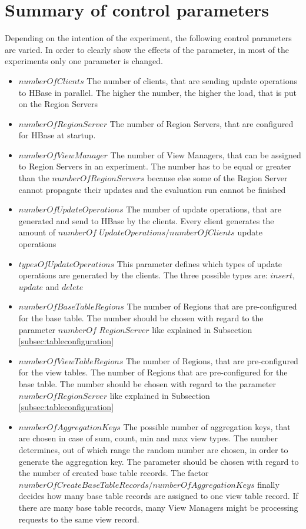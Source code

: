 \documentclass[11pt,a4paper,bibtotoc,idxtotoc,headsepline,footsepline,footexclude,BCOR12mm,DIV13]{scrbook}
\begin{document}
\section{Summary of control parameters}
Depending on the intention of the experiment, the following control parameters are varied. In order to clearly show the effects of the parameter, in most of the experiments only one parameter is changed.
\begin{itemize}
	\item $numberOfClients$ The number of clients, that are sending update operations to HBase in parallel. The higher the number, the higher the load, that is put on the Region Servers		
	\item $numberOfRegionServer$ The number of Region Servers, that are configured for HBase at startup. 
	\item $numberOfViewManager$ The number of View Managers, that can be assigned to Region Servers in an experiment. The number has to be equal or greater than the $numberOfRegionServers$ because else some of the Region Server cannot propagate their updates and the evaluation run cannot be finished
	\item $numberOfUpdateOperations$ The number of update operations, that are generated and send to HBase by the clients. Every client generates the amount of $numberOf$ $UpdateOperations/numberOfClients$ update operations
	\item $typesOfUpdateOperations$ This parameter defines which types of update operations are generated by the clients. The three possible types are: $insert$,$update$ and $delete$
	\item $numberOfBaseTableRegions$ The number of Regions that are pre-configured for the base table. The number should be chosen with regard to the parameter $numberOf$ $RegionServer$ like explained in Subsection \ref{subsec:tableconfiguration} 
	\item $numberOfViewTableRegions$ The number of Regions, that are pre-configured for the view tables. The number of Regions that are pre-configured for the base table. The number should be chosen with regard to the parameter $numberOfRegionServer$ like explained in Subsection \ref{subsec:tableconfiguration}  
	\item $numberOfAggregationKeys$ The possible number of aggregation keys, that are chosen in case of sum, count, min and max view types. The number determines, out of which range the random number are chosen, in order to generate the aggregation key. The parameter should be chosen with regard to the number of created base table records. The factor $numberOfCreateBaseTableRecords/numberOfAggregationKeys$ finally decides how many base table records are assigned to one view table record. If there are many base table records, many View Managers might be processing requests to the same view record. 

\end{itemize}
\end{document}
